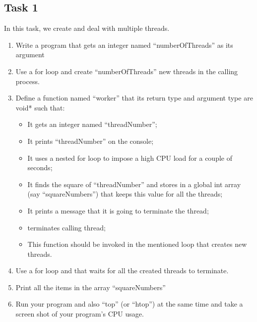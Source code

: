\documentclass[16pt]{article}
\begin{document}
\subsection*{Task 1}
In this task, we create and deal with multiple threads.
\begin{enumerate}
\item Write a program that gets an integer named ``numberOfThreads'' as its argument
\item Use a for loop and create ``numberOfThreads'' new threads in the calling process.
\item Define a function named ``worker'' that its return type and argument type are void* such that:
\begin{itemize}
\item It gets an integer named ``threadNumber'';
\item It prints ``threadNumber'' on the console;
\item It uses a nested for loop to impose a high CPU load for a couple of seconds;
\item It finds the square of ``threadNumber'' and stores in a global int array (say ``squareNumbers'') that keeps this value for all the threads;
\item It prints a message that it is going to terminate the thread;
\item terminates calling thread;
\item This function should be invoked in the mentioned loop that creates new threads.
\end{itemize}
\item Use a for loop and that waits for all the created threads to terminate.
\item Print all the items in the array ``squareNumbers''
\item Run your program and also ``top'' (or ``htop'') at the same time and take a screen shot of your program's CPU usage.
\end{enumerate}
\end{document}
